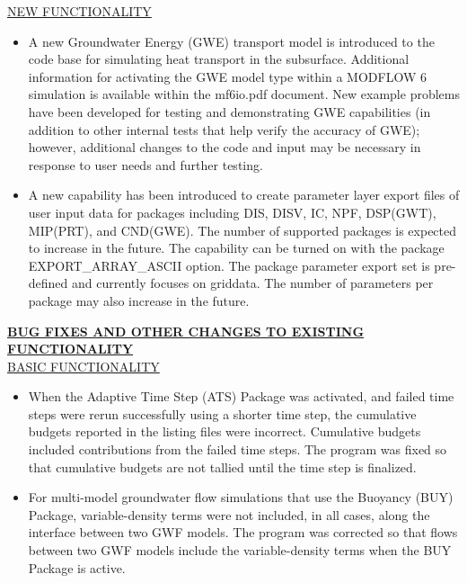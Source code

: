 	
	\item \currentmodflowversion
	
	\underline{NEW FUNCTIONALITY}
	\begin{itemize}
		\item A new Groundwater Energy (GWE) transport model is introduced to the code base for simulating heat transport in the subsurface.  Additional information for activating the GWE model type within a MODFLOW 6 simulation is available within the mf6io.pdf document.  New example problems have been developed for testing and demonstrating GWE capabilities (in addition to other internal tests that help verify the accuracy of GWE); however, additional changes to the code and input may be necessary in response to user needs and further testing.
	    \item A new capability has been introduced to create parameter layer export files of user input data for packages including DIS, DISV, IC, NPF, DSP(GWT), MIP(PRT), and CND(GWE).  The number of supported packages is expected to increase in the future.  The capability can be turned on with the package EXPORT\_ARRAY\_ASCII option.  The package parameter export set is pre-defined and currently focuses on griddata.  The number of parameters per package may also increase in the future.
	\end{itemize}


	\textbf{\underline{BUG FIXES AND OTHER CHANGES TO EXISTING FUNCTIONALITY}} \\
	\underline{BASIC FUNCTIONALITY}
	\begin{itemize}
		\item When the Adaptive Time Step (ATS) Package was activated, and failed time steps were rerun successfully using a shorter time step, the cumulative budgets reported in the listing files were incorrect.  Cumulative budgets included contributions from the failed time steps.  The program was fixed so that cumulative budgets are not tallied until the time step is finalized.
		\item For multi-model groundwater flow simulations that use the Buoyancy (BUY) Package, variable-density terms were not included, in all cases, along the interface between two GWF models.  The program was corrected so that flows between two GWF models include the variable-density terms when the BUY Package is active.
	\end{itemize}

